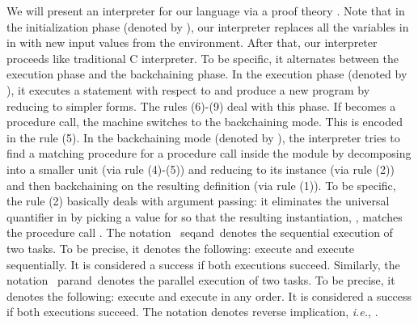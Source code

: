 \documentclass[12pt]{article}
\newcommand{\ie}{{\em i.e.}}
\begin{document}
 We will  present an interpreter for our language via a proof theory \cite{Khan87,MNPS91}.
 Note that in the initialization phase (denoted by ), our interpreter
 replaces all the variables in  in 
 with new input values from the environment. 
After that, our interpreter proceeds like traditional C interpreter.
 To be specific, it alternates between 
 the  execution phase 
and the backchaining phase.  
In  the  execution phase (denoted by ), it  
executes a statement   with respect to
  and
produce a new program 
by reducing  
to simpler forms. The rules
(6)-(9) deal with this phase.
If  becomes a procedure call, the machine switches to the backchaining mode. This is encoded in the rule (5). 
In the backchaining mode (denoted by ), the interpreter tries 
to find a matching procedure  for a procedure call  inside the module 
 by decomposing  into a smaller unit (via rule (4)-(5)) and
 reducing  to  its instance
 (via rule (2)) and then backchaining on the resulting 
definition (via rule (1)).
 To be specific, the rule (2) basically deals with argument passing: it eliminates the universal quantifier  in 
by picking a value  for
 so that the resulting instantiation,  , matches the procedure call .
The notation \ seqand\  denotes the  sequential execution of two tasks. To be precise, it denotes
the following: execute  and execute
 sequentially. It is considered a success if both executions succeed.
Similarly, the notation \ parand\  denotes the  parallel execution of two tasks. To be precise, it denotes
the following: execute  and execute
  in any order.  It is considered a success if both executions succeed.
The notation  denotes  reverse implication, \ie, .
\end{document}
